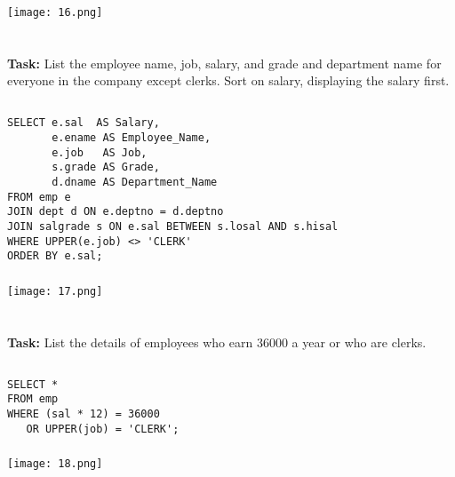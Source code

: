 \documentclass[12pt,a4paper]{article}
\begin{document}
\subsubsection{}
\begin{center}
    \texttt{[image: 16.png]}
\end{center}


\section{}
\textbf{Task:} List the employee name, job, salary, and grade and department name for
everyone in the company except clerks. Sort on salary, displaying the
salary first.

\subsection{}
\begin{lstlisting}
SELECT e.sal  AS Salary,
       e.ename AS Employee_Name,
       e.job   AS Job,
       s.grade AS Grade,
       d.dname AS Department_Name
FROM emp e
JOIN dept d ON e.deptno = d.deptno
JOIN salgrade s ON e.sal BETWEEN s.losal AND s.hisal
WHERE UPPER(e.job) <> 'CLERK'
ORDER BY e.sal;
\end{lstlisting}

\subsubsection{}
\begin{center}
    \texttt{[image: 17.png]}
\end{center}


\section{}
\textbf{Task:} List the details of employees who earn 36000 a year or who are clerks.

\subsection{}
\begin{lstlisting}
SELECT *
FROM emp
WHERE (sal * 12) = 36000
   OR UPPER(job) = 'CLERK';
\end{lstlisting}

\subsubsection{}
\begin{center}
    \texttt{[image: 18.png]}
\end{center}
\end{document}

